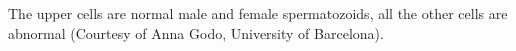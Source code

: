 \label{fig:intro} {The upper cells are normal male and female spermatozoids, all the other
cells are abnormal (Courtesy of Anna Godo, University of Barcelona).%
}
